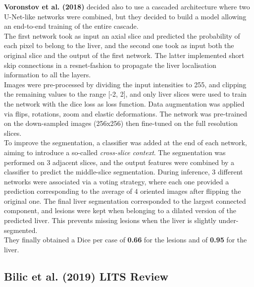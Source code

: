 \textbf{Voronstov et al. (2018)} decided also to use a cascaded
architecture where two U-Net-like networks were combined, but they
decided to build a model allowing an end-to-end training of the entire
cascade.\\
The first network took as input an axial slice and predicted the
probability of each pixel to belong to the liver, and the second one
took as input both the original slice and the output of the first
network. The latter implemented short skip connections in a
resnet-fashion to propagate the liver localisation information to all
the layers.\\
Images were pre-processed by dividing the input intensities to 255, and
clipping the remaining values to the range {[}-2, 2{]}, and only liver
slices were used to train the network with the dice loss as loss
function.
Data augmentation was applied via flips, rotations, zoom and elastic
deformations.
The network was pre-trained on the down-sampled images (256x256) then
fine-tuned on the full resolution slices.\\
To improve the segmentation, a classifier was added at the end of each
network, aiming to introduce a so-called \emph{cross-slice context}. The
segmentation was performed on 3 adjacent slices, and the output features
were combined by a classifier to predict the middle-slice segmentation.
During inference, 3 different networks were associated via a voting
strategy, where each one provided a prediction corresponding to the
average of 4 oriented images after flipping the original one.
The final liver segmentation corresponded to the largest connected
component, and lesions were kept when belonging to a dilated version of
the predicted liver. This prevents missing lesions when the liver is
slightly under-segmented.\\
They finally obtained a Dice per case of \textbf{0.66} for the lesions
and of \textbf{0.95} for the liver.

\subsection{Bilic et al. (2019) LITS
Review}\label{bilic-et-al.-2019-lits-review}

